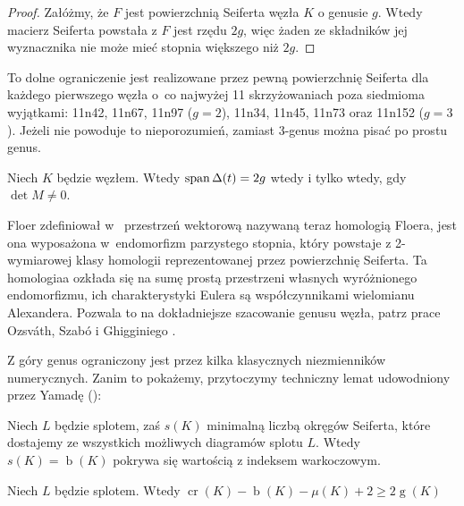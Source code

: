 \begin{proof}
    Załóżmy, że $F$ jest powierzchnią Seiferta węzła $K$ o genusie $g$.
    Wtedy macierz Seiferta powstała z $F$ jest rzędu $2g$, więc żaden ze składników jej wyznacznika nie może mieć stopnia większego niż $2g$.
\end{proof}

To dolne ograniczenie jest realizowane przez pewną powierzchnię Seiferta dla każdego pierwszego węzła o~co najwyżej 11 skrzyżowaniach poza siedmioma wyjątkami: 11n42, 11n67, 11n97 ($g = 2$), 11n34, 11n45, 11n73 oraz 11n152 ($g=3$).
Jeżeli nie powoduje to nieporozumień, zamiast 3-genus można pisać po prostu genus.

\begin{proposition}
    Niech $K$ będzie węzłem.
    Wtedy $\operatorname{span} \Delta(t) = 2g$ wtedy i tylko wtedy, gdy $\det M \neq 0$.
\end{proposition}

Floer zdefiniował w~\cite{floer90} przestrzeń wektorową nazywaną teraz homologią Floera, jest ona wyposażona w~endomorfizm parzystego stopnia, który powstaje z 2-wymiarowej klasy homologii reprezentowanej przez powierzchnię Seiferta.
Ta homologiaa ozkłada się na sumę prostą przestrzeni własnych wyróżnionego endomorfizmu, ich charakterystyki Eulera są współczynnikami wielomianu Alexandera.
Pozwala to na dokładniejsze szacowanie genusu węzła, patrz prace Ozsváth, Szabó \cite{szabo03} i Ghigginiego \cite{ghiggini08}.

Z góry genus ograniczony jest przez kilka klasycznych niezmienników numerycznych.
Zanim to pokażemy, przytoczymy techniczny lemat udowodniony przez Yamadę (\cite{yamada87}):

\begin{proposition}
    \label{seifert_circles_braid}
    Niech $L$ będzie splotem, zaś $s(K)$ minimalną liczbą okręgów Seiferta, które dostajemy ze wszystkich możliwych diagramów splotu $L$.
    Wtedy $s(K) = \operatorname{b}(K)$ pokrywa się wartością z indeksem warkoczowym.
\end{proposition}

\begin{proposition}
    Niech $L$ będzie splotem.
    Wtedy $\operatorname{cr} (K) - \operatorname{b} (K) - \mu(K) + 2 \ge 2 \operatorname{g}(K)$
\end{proposition}

